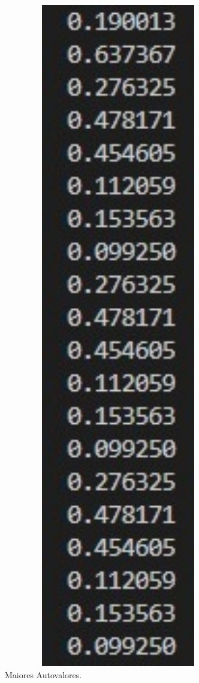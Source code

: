 \documentclass{article}
\begin{document}
\begin{figure}[!h]
\centering
\includegraphics[width=10cm]{autovalores.jpg}
\caption{Maiores Autovalores.}
\label{fig:autovalores.jpg}
\end{figure}
\end{document}
